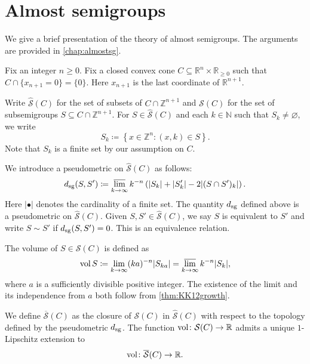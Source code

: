 \section{Almost semigroups}\label{sec:clo1}
We give a brief presentation of the theory of almost semigroups. The arguments are provided in \cref{chap:almostsg}.

Fix an integer $n\geq 0$. Fix a closed convex cone $C\subseteq \mathbb{R}^{n}\times \mathbb{R}_{\geq 0}$ such that $C\cap \{x_{n+1}=0\}=\{0\}$. Here $x_{n+1}$ is the last coordinate of $\mathbb{R}^{n+1}$.

Write $\hat{\mathcal{S}}(C)$ for the set of subsets of $C\cap \mathbb{Z}^{n+1}$ and $\mathcal{S}(C)$ for the set of subsemigroups $S\subseteq C\cap \mathbb{Z}^{n+1}$. For $S\in \hat{\mathcal{S}}(C)$ and each $k\in \mathbb{N}$ such that $S_k\neq\varnothing$, we write
\[
S_k\coloneqq \left\{x\in \mathbb{Z}^n: (x,k)\in S \right\}.
\]
Note that $S_k$ is a finite set by our assumption on $C$.

We introduce a pseudometric on $\hat{\mathcal{S}}(C)$ as follows:
\begin{equation}\label{eq:dsgdef}
d_{\mathrm{sg}}(S,S')\coloneqq \varlimsup_{k\to\infty} k^{-n} \left(|S_k|+|S'_k|-2|(S\cap S')_k|\right).
\end{equation}
Here $|\bullet|$ denotes the cardinality of a finite set. The quantity $d_{\mathrm{sg}}$ defined above is a pseudometric on $\hat{\mathcal{S}}(C)$.
Given $S,S'\in \hat{\mathcal{S}}(C)$, we say $S$ is equivalent to $S'$ and write $S\sim S'$ if $d_{\mathrm{sg}}(S,S')=0$. This is an equivalence relation.

The volume of $S\in \mathcal{S}(C)$ is defined as
\[
\operatorname{vol} S\coloneqq \lim_{k\to\infty} (ka)^{-n}|S_{ka}|=\varlimsup_{k\to\infty} k^{-n}|S_k|,
\]
where $a$ is a sufficiently divisible positive integer.
The existence of the limit and its independence from $a$ both follow from \cref{thm:KK12growth}.

We define $\overline{\mathcal{S}}(C)$ as the closure of $\mathcal{S}(C)$ in $\hat{\mathcal{S}}(C)$ with respect to the topology defined by the pseudometric $d_{\mathrm{sg}}$.
The function $\operatorname{vol}\colon \mathcal{S}(C)\rightarrow \mathbb{R}$ admits a unique $1$-Lipschitz extension to
\begin{equation}\label{eq:volex}
\operatorname{vol}\colon \overline{\mathcal{S}}(C)\rightarrow \mathbb{R}.
\end{equation}

